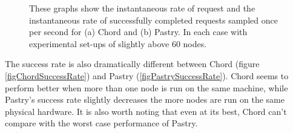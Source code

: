 \begin{figure}[!h]
  \centering
  \caption{These graphs show the instantaneous rate of request and the instantaneous rate of successfully completed requests sampled once per second for (a) Chord and (b) Pastry. In each case with experimental set-ups of slightly above 60 nodes.}
\end{figure}

The success rate is also dramatically different between Chord (figure \ref{figChordSuccessRate}) and Pastry (\ref{figPastrySuccessRate}). Chord seems to perform better when more than one node is run on the same machine, while Pastry's success rate slightly decreases the more nodes are run on the same physical hardware. It is also worth noting that even at its best, Chord can't compare with the worst case performance of Pastry.

